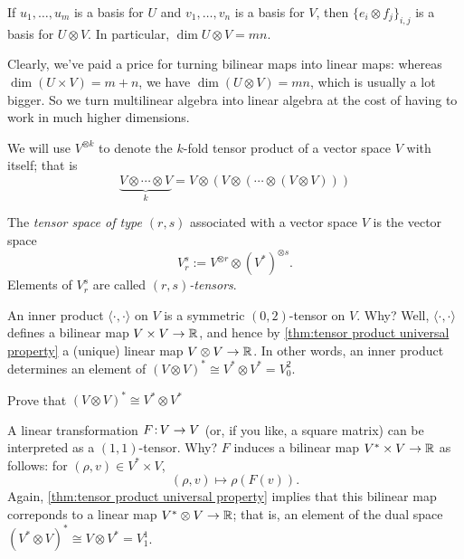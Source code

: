 \begin{proposition}\label{prop:tensor basis}
	If $u_1, \dots , u_m$ is a basis for $U$ and $v_1, \dots , v_n$ is a basis for $V$, then $\{e_i \otimes f_j\}_{i,j}$ is a basis for $U \otimes V$. In particular, $\dim U \otimes V = mn$.
\end{proposition}

Clearly, we've paid a price for turning bilinear maps into linear maps: whereas $\dim(U \times V) = m+n$, we have $\dim(U \otimes V) = mn$, which is usually a lot bigger. So we turn multilinear algebra into linear algebra at the cost of having to work in much higher dimensions.

\begin{notation}
	We will use $V^{\otimes k}$ to denote the $k$-fold tensor product of a vector space $V$ with itself; that is
	\[
		\underbrace{V \otimes \cdots \otimes V}_k = V \otimes (V \otimes( \cdots \otimes (V \otimes V)))
	\]
\end{notation}

\begin{definition}\label{def:tensor space}
	The \emph{tensor space of type $(r,s)$} associated with a vector space $V$ is the vector space
	\[
		V_r^s := V^{\otimes r} \otimes (V^\ast)^{\otimes s}.
	\]
	Elements of $V_r^s$ are called \emph{$(r,s)$-tensors}.
\end{definition}

\begin{example}
	An inner product $\langle \cdot , \cdot \rangle$ on $V$ is a symmetric $(0,2)$-tensor on $V$. Why? Well, $\langle \cdot , \cdot \rangle$ defines a bilinear map $V \times V \to \mathbb{R}$, and hence by \cref{thm:tensor product universal property} a (unique) linear map $V \otimes V \to \mathbb{R}$. In other words, an inner product determines an element of $(V \otimes V)^\ast \cong V^\ast \otimes V^\ast = V_0^2$.
	\begin{exercise}
		Prove that $(V \otimes V)^\ast \cong V^\ast \otimes V^\ast$
	\end{exercise}
\end{example}

\begin{example}
	A linear transformation $F\colon\thinspace\!\! V \to V$ (or, if you like, a square matrix) can be interpreted as a $(1,1)$-tensor. Why? $F$ induces a bilinear map $V^\ast \times V \to \mathbb{R}$ as follows: for $(\rho,v) \in V^\ast \times V$,
	\[
		(\rho, v ) \mapsto \rho(F(v)).
	\]
	Again, \cref{thm:tensor product universal property} implies that this bilinear map correponds to a linear map $V^\ast \otimes V \to \mathbb{R}$; that is, an element of the dual space $(V^\ast \otimes V)^\ast \cong V \otimes V^\ast = V_1^1$.
\end{example}


